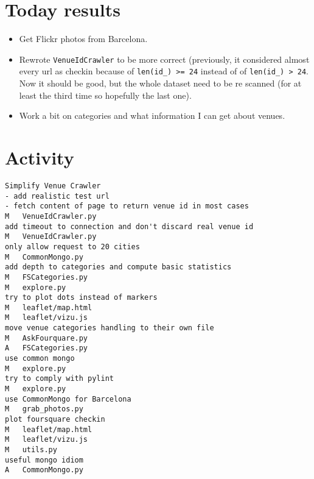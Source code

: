 \section*{Today results}
\begin{itemize}
	\item Get Flickr photos from Barcelona.
	\item Rewrote \texttt{VenueIdCrawler} to be more correct (previously, it
		considered almost every url as checkin because of \texttt{len(id\_) >=
		24} instead of of \texttt{len(id\_) > 24}. Now it should be good, but
		the whole dataset need to be re scanned (for at least the third time
		so hopefully the last one).
	\item Work a bit on categories and what information I can get about
		venues.
\end{itemize}

\section*{Activity}
\begin{verbatim}
Simplify Venue Crawler
- add realistic test url
- fetch content of page to return venue id in most cases
M	VenueIdCrawler.py
add timeout to connection and don't discard real venue id
M	VenueIdCrawler.py
only allow request to 20 cities
M	CommonMongo.py
add depth to categories and compute basic statistics
M	FSCategories.py
M	explore.py
try to plot dots instead of markers
M	leaflet/map.html
M	leaflet/vizu.js
move venue categories handling to their own file
M	AskFourquare.py
A	FSCategories.py
use common mongo
M	explore.py
try to comply with pylint
M	explore.py
use CommonMongo for Barcelona
M	grab_photos.py
plot foursquare checkin
M	leaflet/map.html
M	leaflet/vizu.js
M	utils.py
useful mongo idiom
A	CommonMongo.py
\end{verbatim}
